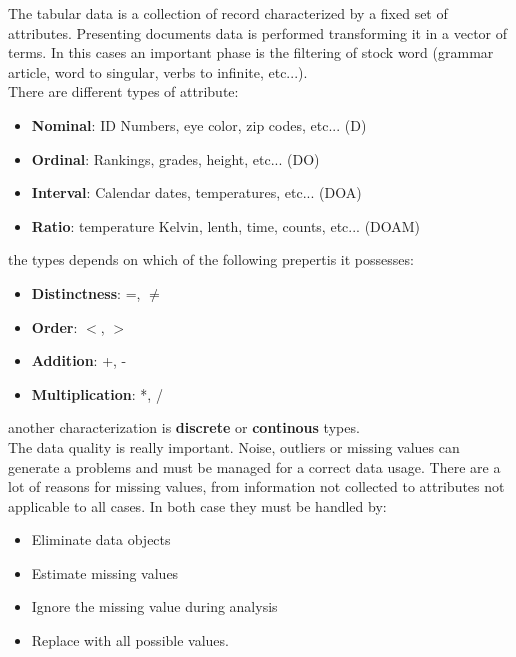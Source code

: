 \documentclass[12pt]{article}
\begin{document}
The tabular data is a collection of record characterized by a fixed set of attributes. Presenting documents data is performed transforming it in a vector of terms. In this cases an important phase is the filtering of stock word (grammar article, word to singular, verbs to infinite, etc...).\\
There are different types of attribute:
\begin{itemize}
  \item \textbf{Nominal}: ID Numbers, eye color, zip codes, etc... (D)
  \item \textbf{Ordinal}: Rankings, grades, height, etc... (DO)
  \item \textbf{Interval}: Calendar dates, temperatures, etc... (DOA)
  \item \textbf{Ratio}: temperature Kelvin, lenth, time, counts, etc... (DOAM)
\end{itemize}
the types depends on which of the following prepertis it possesses:
\begin{itemize}
  \item \textbf{Distinctness}: =, $\neq$
  \item \textbf{Order}: $<$, $>$
  \item \textbf{Addition}: +, -
  \item \textbf{Multiplication}: *, /
\end{itemize}
another characterization is \textbf{discrete} or \textbf{continous} types.\\
The data quality is really important. Noise, outliers or missing values can generate a problems and must be managed for a correct data usage. There are a lot of reasons for missing values, from information not collected to attributes not applicable to all cases. In both case they must be handled by:
\begin{itemize}
  \item Eliminate data objects
  \item Estimate missing values
  \item Ignore the missing value during analysis
  \item Replace with all possible values.
\end{itemize}
\end{document}
